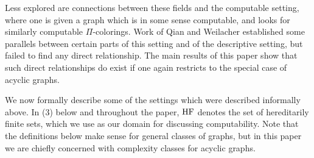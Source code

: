 \documentclass[11pt]{amsart}
\theoremstyle{definition}
\newcommand{\HF}{\textnormal{HF}}
\begin{document}
Less explored are connections between these fields and the computable setting, where one is given a graph which is in some sense computable, and looks for similarly computable $\Pi$-colorings. Work of Qian and Weilacher \cite{QW_ASI} established some parallels between certain parts of this setting and of the descriptive setting, but failed to find any direct relationship. The main results of this paper show that such direct relationships do exist if one again restricts to the special case of acyclic graphs.

We now formally describe some of the settings which were described informally above. In (3) below and throughout the paper, $\HF$ denotes the set of hereditarily finite sets, which we use as our domain for discussing computability. Note that the definitions below make sense for general classes of graphs, but in this paper we are chiefly concerned with complexity classes for acyclic graphs.
\end{document}
